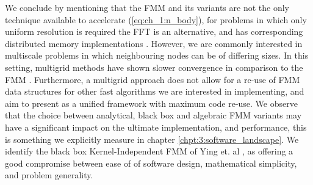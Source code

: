 We conclude by mentioning that the FMM and its variants are not the only technique available to accelerate (\ref{eq:ch_1:n_body}), for problems in which only uniform resolution is required the FFT is an alternative, and has corresponding distributed memory implementations \cite{gholami2015accfft}. However, we are commonly interested in multiscale problems in which neighbouring nodes can be of differing sizes. In this setting, multigrid methods have shown slower convergence in comparison to the FMM \cite{yokota2015fast,gholami2016fft}. Furthermore, a multigrid approach does not allow for a re-use of FMM data structures for other fast algorithms we are interested in implementing, and aim to present as a unified framework with maximum code re-use. We observe that the choice between analytical, black box and algebraic FMM variants may have a significant impact on the ultimate implementation, and performance, this is something we explicitly measure in chapter \ref{chpt:3:software_landscape}. We identify the black box Kernel-Independent FMM of Ying et. al \cite{Ying:2004:JCP}, as offering a good compromise between ease of of software design, mathematical simplicity, and problem generality.

